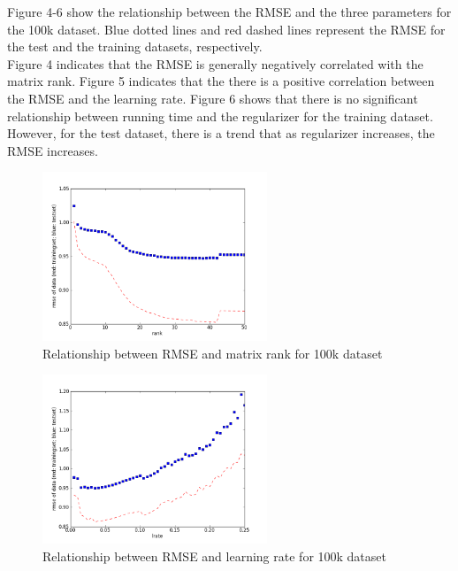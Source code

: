 \documentclass[12pt]{article}
\begin{document}
\noindent Figure 4-6 show the relationship between the RMSE and the three parameters
for the 100k dataset. Blue dotted lines and red dashed lines represent the RMSE for
the test and the training datasets, respectively.\\

\noindent Figure 4 indicates that the RMSE is generally negatively correlated
with the matrix rank. Figure 5 indicates that the there is a positive correlation
between the RMSE and the learning rate. Figure 6 shows that there is no significant 
relationship between running time and the regularizer for the training dataset. However,
for the test dataset, there is a trend that as regularizer increases, the RMSE increases.

\begin{figure}[H]
\centering
\includegraphics[width=0.60\textwidth]{graphs/smallrmserank.png}
\caption{Relationship between RMSE and matrix rank for 100k dataset}
\end{figure}

\begin{figure}[H]
\centering
\includegraphics[width=0.60\textwidth]{graphs/smallrmselr.png}
\caption{Relationship between RMSE and learning rate for 100k dataset}
\end{figure}
\end{document}
